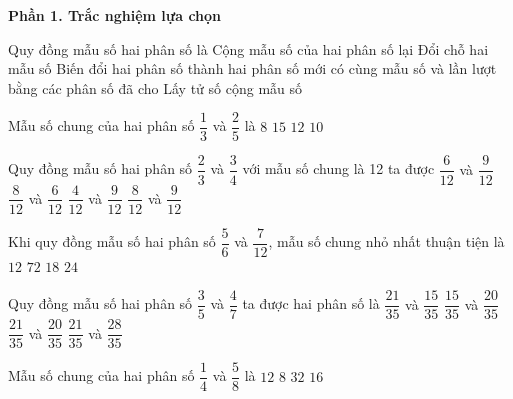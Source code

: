 \textbf{Phần 1. Trắc nghiệm lựa chọn}

\begin{ex} %
Quy đồng mẫu số hai phân số là
\choice
{Cộng mẫu số của hai phân số lại}
{Đổi chỗ hai mẫu số}
{\True Biến đổi hai phân số thành hai phân số mới có cùng mẫu số và lần lượt bằng các phân số đã cho}
{Lấy tử số cộng mẫu số}
\end{ex}

\begin{ex} %
Mẫu số chung của hai phân số $\dfrac{1}{3}$ và $\dfrac{2}{5}$ là
\choice
{$8$}
{\True $15$}
{$12$}
{$10$}
\end{ex}

\begin{ex} %
Quy đồng mẫu số hai phân số $\dfrac{2}{3}$ và $\dfrac{3}{4}$ với mẫu số chung là 12 ta được
\choice
{$\dfrac{6}{12}$ và $\dfrac{9}{12}$}
{$\dfrac{8}{12}$ và $\dfrac{6}{12}$}
{$\dfrac{4}{12}$ và $\dfrac{9}{12}$}
{\True $\dfrac{8}{12}$ và $\dfrac{9}{12}$}
\end{ex}

\begin{ex} %
Khi quy đồng mẫu số hai phân số $\dfrac{5}{6}$ và $\dfrac{7}{12}$, mẫu số chung nhỏ nhất thuận tiện là
\choice
{\True $12$}
{$72$}
{$18$}
{$24$}
\end{ex}

\begin{ex} %
Quy đồng mẫu số hai phân số $\dfrac{3}{5}$ và $\dfrac{4}{7}$ ta được hai phân số là
\choice
{$\dfrac{21}{35}$ và $\dfrac{15}{35}$}
{$\dfrac{15}{35}$ và $\dfrac{20}{35}$}
{\True $\dfrac{21}{35}$ và $\dfrac{20}{35}$}
{$\dfrac{21}{35}$ và $\dfrac{28}{35}$}
\end{ex}

\begin{ex} %
Mẫu số chung của hai phân số $\dfrac{1}{4}$ và $\dfrac{5}{8}$ là
\choice
{$12$}
{\True $8$}
{$32$}
{$16$}
\end{ex}

